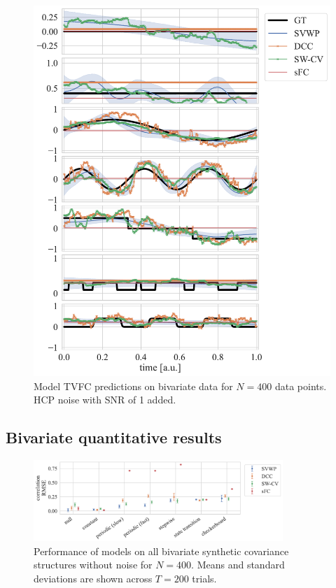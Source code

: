 \begin{figure}[h]
  \centering
  \includegraphics[width=\textwidth]{fig/sim/d2/N0400_T0200/HCP_noise_snr_1/all_covs_types_correlations}
  \caption{
    Model TVFC predictions on bivariate data for $N = 400$ data points.
    HCP noise with SNR of 1 added.
  }\label{fig:results-all-covariance-structures-tvfc-predictions-snr-1}
\end{figure}


\clearpage
\subsection{Bivariate quantitative results}


\begin{figure}[ht]
  \centering
  \includegraphics[width=0.84\textwidth]{fig/sim/d2/N0400_T0200/no_noise/correlation_RMSE}
  \caption{
    Performance of models on all bivariate synthetic covariance structures without noise for $N = 400$.
    Means and standard deviations are shown across $T = 200$ trials.
  }\label{fig:results-sim-d2-400-all-correlation-RMSE-no-noise}
\end{figure}


